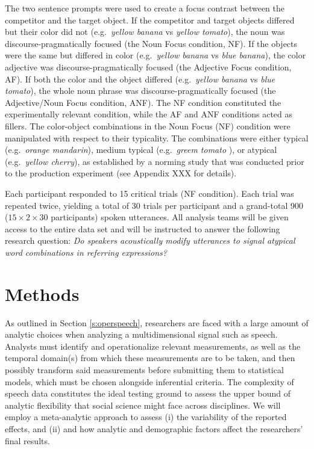 \documentclass[
  12pt,
]{article}
\begin{document}
The two sentence prompts were used to create a focus contrast between the competitor and the target object.
If the competitor and target objects differed but their color did not (e.g.~\emph{yellow banana} vs \emph{yellow tomato}), the noun was discourse-pragmatically focused (the Noun Focus condition, NF).
If the objects were the same but differed in color (e.g.~\emph{yellow banana} vs \emph{blue banana}), the color adjective was discourse-pragmatically focused (the Adjective Focus condition, AF).
If both the color and the object differed (e.g.~\emph{yellow banana} vs \emph{blue tomato}), the whole noun phrase was discourse-pragmatically focused (the Adjective/Noun Focus condition, ANF).
The NF condition constituted the experimentally relevant condition, while the AF and ANF conditions acted as fillers.
The color-object combinations in the Noun Focus (NF) condition were manipulated with respect to their typicality.
The combinations were either typical (e.g.~\emph{orange mandarin}), medium typical (e.g.~\emph{greem tomato} ), or atypical (e.g.~\emph{yellow cherry}), as established by a norming study that was conducted prior to the production experiment (see Appendix XXX for details).

Each participant responded to 15 critical trials (NF condition).
Each trial was repeated twice, yielding a total of 30 trials per participant and a grand-total 900 (\(15 \times 2 \times 30\) participants) spoken utterances.
All analysis teams will be given access to the entire data set and will be instructed to answer the following research question: \emph{Do speakers acoustically modify utterances to signal atypical word combinations in referring expressions?}

\hypertarget{methods}{%
\section{Methods}\label{methods}}

As outlined in Section \ref{s:operspeech}, researchers are faced with a large amount of analytic choices when analyzing a multidimensional signal such as speech.
Analysts must identify and operationalize relevant measurements, as well as the temporal domain(s) from which these measurements are to be taken, and then possibly transform said measurements before submitting them to statistical models, which must be chosen alongside inferential criteria.
The complexity of speech data constitutes the ideal testing ground to assess the upper bound of analytic flexibility that social science might face across disciplines.
We will employ a meta-analytic approach to assess (i) the variability of the reported effects, and (ii) and how analytic and demographic factors affect the researchers' final results.
\end{document}
